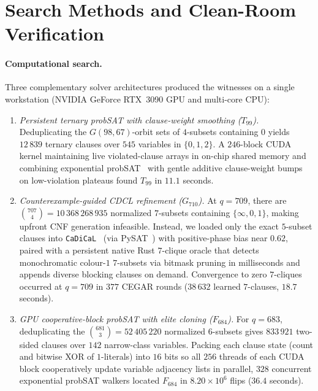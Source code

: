 \documentclass[11pt]{article}
\theoremstyle{remark}
\begin{document}
\section{Search Methods and Clean-Room Verification}\label{sec:verif}

\paragraph{Computational search.}
Three complementary solver architectures produced the witnesses on a single
workstation (NVIDIA GeForce RTX~3090 GPU and multi-core CPU):
\begin{enumerate}
\item \emph{Persistent ternary probSAT with clause-weight smoothing ($T_{99}$).}
  Deduplicating the $G(98,67)$-orbit sets of $4$-subsets containing $0$ yields
  $12\,839$ ternary clauses over $545$ variables in $\{0,1,2\}$. A $246$-block
  CUDA kernel maintaining live violated-clause arrays in on-chip shared memory
  and combining exponential probSAT~\cite{probsat} with gentle additive
  clause-weight bumps on low-violation plateaus found $T_{99}$ in $11.1$
  seconds.
\item \emph{Counterexample-guided CDCL refinement ($G_{710}$).}
  At $q=709$, there are $\binom{707}{4}=10\,368\,268\,935$ normalized
  $7$-subsets containing $\{\infty,0,1\}$, making upfront CNF generation
  infeasible. Instead, we loaded only the exact $5$-subset clauses into
  \texttt{CaDiCaL}~\cite{cadical} (via PySAT~\cite{pysat}) with positive-phase
  bias near $0.62$, paired with a persistent native Rust $7$-clique oracle that
  detects monochromatic colour-$1$ $7$-subsets via bitmask pruning in
  milliseconds and appends diverse blocking clauses on demand. Convergence to
  zero $7$-cliques occurred at $q=709$ in $377$ CEGAR rounds ($38\,632$ learned
  $7$-clauses, $18.7$ seconds).
\item \emph{GPU cooperative-block probSAT with elite cloning ($F_{684}$).}
  For $q=683$, deduplicating the $\binom{681}{3}=52\,405\,220$ normalized
  $6$-subsets gives $833\,921$ two-sided clauses over $142$ narrow-class
  variables. Packing each clause state (count and bitwise XOR of $1$-literals)
  into $16$ bits so all $256$ threads of each CUDA block cooperatively update
  variable adjacency lists in parallel, $328$ concurrent exponential probSAT
  walkers located $F_{684}$ in $8.20\times 10^6$ flips ($36.4$ seconds).
\end{enumerate}
\end{document}
